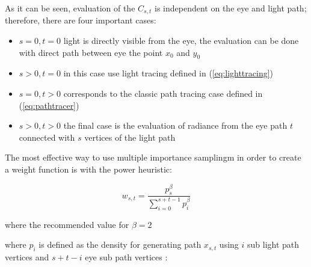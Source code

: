 \documentclass[11pt, a4paper]{article}
\begin{document}
As it can be seen, evaluation of the $C_{s,t}$ is independent on the eye and light path; therefore, there are four important cases:

\begin{itemize}
    \item{$s=0,t=0$ light is directly visible from the eye, the evaluation can be done with direct path between eye the point $x_0$ and $y_0$}
    \item{$s>0,t=0$ in this case use light tracing defined in (\ref{eq:lighttracing}) }
    \item{$s=0,t>0$ corresponds to the classic path tracing case defined in (\ref{eq:pathtracer}) }
    \item{$s>0,t>0$ the final case is the evaluation of radiance from the eye path $t$ connected with $s$ vertices of the light path}
\end{itemize}


The most effective way to use multiple importance samplingm in order to create a weight function is with the power heuristic:

\begin{equation}
	w_{s,t} = \frac{p_s^\beta}{\sum_{i=0}^{s+t-1} p_i^\beta}
\end{equation}

where the recommended value for $\beta = 2$ \cite{pbr-book}

where $p_i$ is defined as the density for generating path $x_{s,t}$ using $i$ sub light path vertices and $s+t-i$ eye sub path vertices :
\end{document}
